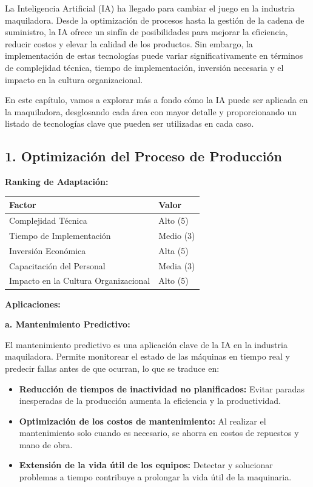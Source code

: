 \documentclass[
  10pt,
  letterpaper,
]{book}
\providecommand{\tightlist}{%
  \setlength{\itemsep}{0pt}\setlength{\parskip}{0pt}}\usepackage{longtable,booktabs,array}
\begin{document}
La Inteligencia Artificial (IA) ha llegado para cambiar el juego en la
industria maquiladora. Desde la optimización de procesos hasta la
gestión de la cadena de suministro, la IA ofrece un sinfín de
posibilidades para mejorar la eficiencia, reducir costos y elevar la
calidad de los productos. Sin embargo, la implementación de estas
tecnologías puede variar significativamente en términos de complejidad
técnica, tiempo de implementación, inversión necesaria y el impacto en
la cultura organizacional.

En este capítulo, vamos a explorar más a fondo cómo la IA puede ser
aplicada en la maquiladora, desglosando cada área con mayor detalle y
proporcionando un listado de tecnologías clave que pueden ser utilizadas
en cada caso.

\subsection{1. Optimización del Proceso de
Producción}\label{optimizaciuxf3n-del-proceso-de-producciuxf3n}

\textbf{Ranking de Adaptación:}

\begin{longtable}[]{@{}ll@{}}
\toprule\noalign{}
Factor & Valor \\
\midrule\noalign{}
\endhead
\bottomrule\noalign{}
\endlastfoot
Complejidad Técnica & Alto (5) \\
Tiempo de Implementación & Medio (3) \\
Inversión Económica & Alta (5) \\
Capacitación del Personal & Media (3) \\
Impacto en la Cultura Organizacional & Alto (5) \\
\end{longtable}

\textbf{Aplicaciones:}

\textbf{a. Mantenimiento Predictivo:}

El mantenimiento predictivo es una aplicación clave de la IA en la
industria maquiladora. Permite monitorear el estado de las máquinas en
tiempo real y predecir fallas antes de que ocurran, lo que se traduce
en:

\begin{itemize}
\tightlist
\item
  \textbf{Reducción de tiempos de inactividad no planificados:} Evitar
  paradas inesperadas de la producción aumenta la eficiencia y la
  productividad.
\item
  \textbf{Optimización de los costos de mantenimiento:} Al realizar el
  mantenimiento solo cuando es necesario, se ahorra en costos de
  repuestos y mano de obra.
\item
  \textbf{Extensión de la vida útil de los equipos:} Detectar y
  solucionar problemas a tiempo contribuye a prolongar la vida útil de
  la maquinaria.
\end{itemize}
\end{document}
